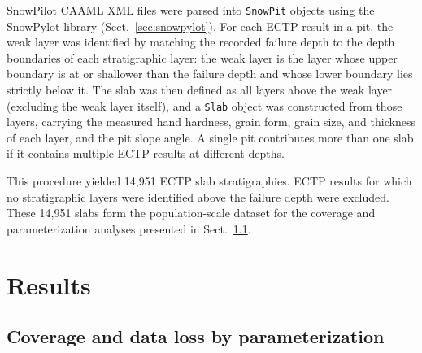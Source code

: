 \documentclass[hess, manuscript]{copernicus}
\begin{document}
SnowPilot CAAML XML files were parsed into \texttt{SnowPit} objects using the SnowPylot library (Sect.~\ref{sec:snowpylot}). For each ECTP result in a pit, the weak layer was identified by matching the recorded failure depth to the depth boundaries of each stratigraphic layer: the weak layer is the layer whose upper boundary is at or shallower than the failure depth and whose lower boundary lies strictly below it. The slab was then defined as all layers above the weak layer (excluding the weak layer itself), and a \texttt{Slab} object was constructed from those layers, carrying the measured hand hardness, grain form, grain size, and thickness of each layer, and the pit slope angle. A single pit contributes more than one slab if it contains multiple ECTP results at different depths.


This procedure yielded 14{,}951 ECTP slab stratigraphies. ECTP results for which no stratigraphic layers were identified above the failure depth were excluded. These 14{,}951 slabs form the population-scale dataset for the coverage and parameterization analyses presented in Sect.~\ref{sec:coverage}.


\section{Results}

\subsection{Coverage and data loss by parameterization}
\label{sec:coverage}

%
%
%
%
\end{document}
